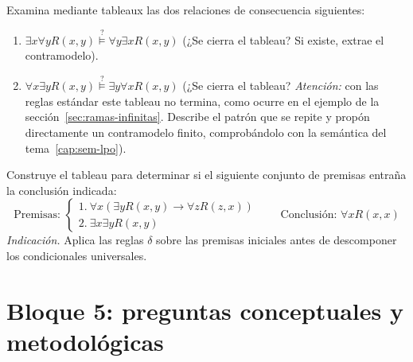 \begin{pregunta}\label{e6-7}
Examina mediante tableaux las dos relaciones de consecuencia siguientes:
\begin{enumerate}
    \item $\exists x \forall y R(x, y) \stackrel{?}{\models} \forall y
      \exists x R(x, y)$ \quad (¿Se cierra el tableau? Si existe,
      extrae el contramodelo).
    \item $\forall x \exists y R(x, y) \stackrel{?}{\models} \exists y
      \forall x R(x, y)$ \quad (¿Se cierra el tableau? \emph{Atención:} con las reglas estándar este tableau no termina, como ocurre en el ejemplo de la sección~\ref{sec:ramas-infinitas}. Describe el patrón que se repite y propón directamente un contramodelo finito, comprobándolo con la semántica del tema~\ref{cap:sem-lpo}).
\end{enumerate}
\end{pregunta}

\begin{pregunta}\label{e6-8}
Construye el tableau para determinar si el siguiente conjunto de premisas entraña la conclusión indicada:
\[
\text{Premisas: } \begin{cases}
1. \ \forall x (\exists y R(x, y) \to \forall z R(z, x)) \\
2. \ \exists x \exists y R(x, y)
\end{cases}
\qquad \text{Conclusión: } \forall x R(x, x)
\]
\emph{Indicación.} Aplica las reglas $\delta$ sobre las premisas iniciales antes de descomponer los condicionales universales.
\end{pregunta}

\section*{Bloque 5: preguntas conceptuales y metodológicas}

